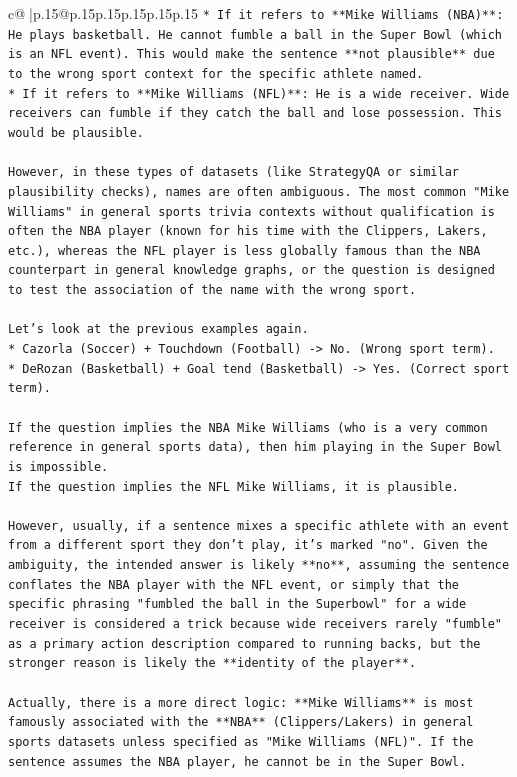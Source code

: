 \documentclass{article}
\begin{document}
{\begin{supertabular}{c@{$\;$}|p{.15\linewidth}@{}p{.15\linewidth}p{.15\linewidth}p{.15\linewidth}p{.15\linewidth}p{.15\linewidth}}
{{{\texttt{*   If it refers to **Mike Williams (NBA)**: He plays basketball. He cannot fumble a ball in the Super Bowl (which is an NFL event). This would make the sentence **not plausible** due to the wrong sport context for the specific athlete named.} \\
\texttt{*   If it refers to **Mike Williams (NFL)**: He is a wide receiver. Wide receivers can fumble if they catch the ball and lose possession. This would be plausible.} \\
\\ 
\texttt{However, in these types of datasets (like StrategyQA or similar plausibility checks), names are often ambiguous. The most common "Mike Williams" in general sports trivia contexts without qualification is often the NBA player (known for his time with the Clippers, Lakers, etc.), whereas the NFL player is less globally famous than the NBA counterpart in general knowledge graphs, or the question is designed to test the association of the name with the wrong sport.} \\
\\ 
\texttt{Let's look at the previous examples again.} \\
\texttt{*   Cazorla (Soccer) + Touchdown (Football) {-}> No. (Wrong sport term).} \\
\texttt{*   DeRozan (Basketball) + Goal tend (Basketball) {-}> Yes. (Correct sport term).} \\
\\ 
\texttt{If the question implies the NBA Mike Williams (who is a very common reference in general sports data), then him playing in the Super Bowl is impossible.} \\
\texttt{If the question implies the NFL Mike Williams, it is plausible.} \\
\\ 
\texttt{However, usually, if a sentence mixes a specific athlete with an event from a different sport they don't play, it's marked "no". Given the ambiguity, the intended answer is likely **no**, assuming the sentence conflates the NBA player with the NFL event, or simply that the specific phrasing "fumbled the ball in the Superbowl" for a wide receiver is considered a trick because wide receivers rarely "fumble" as a primary action description compared to running backs, but the stronger reason is likely the **identity of the player**.} \\
\\ 
\texttt{Actually, there is a more direct logic: **Mike Williams** is most famously associated with the **NBA** (Clippers/Lakers) in general sports datasets unless specified as "Mike Williams (NFL)". If the sentence assumes the NBA player, he cannot be in the Super Bowl.} \\
}}}
\end{supertabular}}
\end{document}

